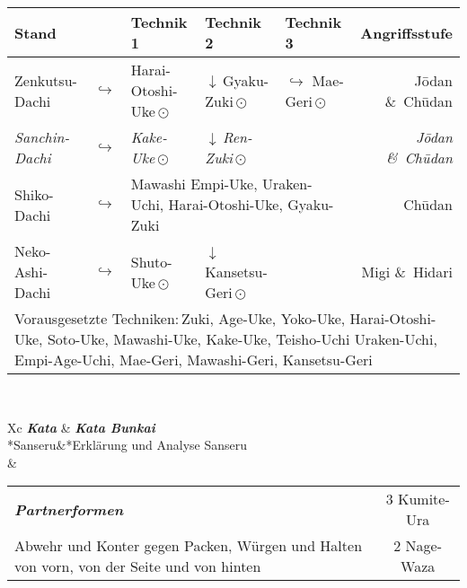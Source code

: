 	\null\vfill\null
	\begin{tabularx}{\textwidth}{llllXr}
		\textbf{Stand} 	&  	& \textbf{Technik 1} & \textbf{Technik 2} 				& \textbf{Technik 3}& \textbf{Angriffsstufe}\\
		\midrule
		Zenkutsu-Dachi 	& \(\hookrightarrow\)	& Harai-Otoshi-Uke\,\(\odot\) 	& \(\downarrow\)\,Gyaku-Zuki\,\(\odot\)	& \(\hookrightarrow\) 	 Mae-Geri\,\(\odot\)	& J\={o}dan \&~Ch\={u}dan \\
		\textit{Sanchin-Dachi }	& \(\hookrightarrow\)	& \textit{Kake-Uke}\,\(\odot\) 			& \(\downarrow\)\,\textit{Ren-Zuki}\,\(\odot\) &				& \textit{J\={o}dan \&~Ch\={u}dan} \\
		Shiko-Dachi 	& \(\hookrightarrow\)	&\multicolumn{3}{l}{Mawashi Empi-Uke, Uraken-Uchi, Harai-Otoshi-Uke, Gyaku-Zuki}	&	 					 Ch\={u}dan \\
		Neko-Ashi-Dachi	& \(\hookrightarrow\)	& Shuto-Uke\,\(\odot\) 			& \(\downarrow\)\,Kansetsu-Geri\,\(\odot\) 					&						& 						 Migi \&~Hidari  \\
		\midrule
		\multicolumn{6}{p{\linewidth-2\tabcolsep}}{{\footnotesize Vorausgesetzte Techniken:\,Zuki, Age-Uke, Yoko-Uke, Harai-Otoshi-Uke, Soto-Uke, Mawashi-Uke, Kake-Uke, Teisho-Uchi Uraken-Uchi, Empi-Age-Uchi, Mae-Geri, Mawashi-Geri, Kansetsu-Geri}}\\
		\midrule
	\end{tabularx}\\
	\null\vfill\null
	\begin{minipage}[t]{0.48\textwidth}
		\begin{tabularx}{\textwidth}{Xc}
			\textbf{\textit{Kata}} & \textbf{\textit{Kata Bunkai}} \\
			*{Sanseru}&*{Erklärung und Analyse Sanseru}\\
			& \\
		\end{tabularx}
	\end{minipage}
	\null\hfill\null
	\begin{minipage}[t]{0.48\textwidth}
		\begin{tabularx}{\textwidth}{Xc}
			{\textbf{\textit{Partnerformen}}} & 3 Kumite-Ura\\
			Abwehr und Konter gegen Packen, Würgen und Halten von vorn, von
			der Seite und von hinten & 2 Nage-Waza  \\
		\end{tabularx}
	\end{minipage}\\
